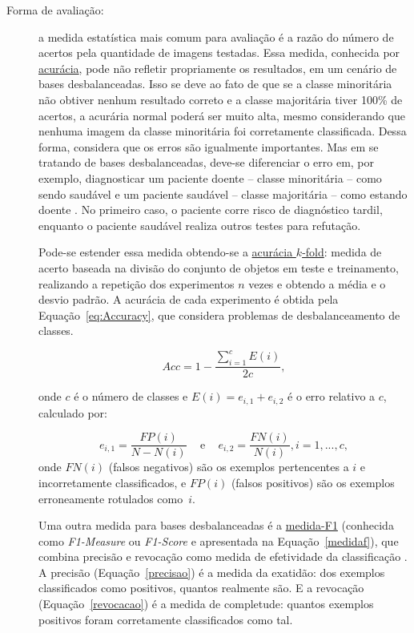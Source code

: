 \begin{description}
\item[Forma de avaliação:] a medida estatística mais comum para avaliação é a razão do número de acertos pela quantidade de imagens testadas. Essa medida, conhecida por \underline{acurácia}, pode não refletir propriamente os resultados, em um cenário de bases desbalanceadas. Isso se deve ao fato de que se a classe minoritária não obtiver nenhum resultado correto e a classe majoritária tiver 100\% de acertos, a acurária normal poderá ser muito alta, mesmo considerando que nenhuma imagem da classe minoritária foi corretamente classificada. Dessa forma, considera que os erros são igualmente importantes. Mas em se tratando de bases desbalanceadas, deve-se diferenciar o erro em, por exemplo, diagnosticar um paciente doente -- classe minoritária -- como sendo saudável e um paciente saudável -- classe majoritária -- como estando doente \cite{Batista2004}. No primeiro caso, o paciente corre risco de diagnóstico tardil, enquanto o paciente saudável realiza outros testes para refutação.

Pode-se estender essa medida obtendo-se a \underline{acurácia $k$-fold}: medida de acerto baseada na divisão do conjunto de objetos em teste e treinamento, realizando a repetição dos experimentos $n$ vezes e obtendo a média e o desvio padrão. A acurácia de cada experimento é obtida pela Equação~\ref{eq:Accuracy}, que considera problemas de desbalanceamento de classes.

    \begin{equation}
      Acc = 1 - \frac{\sum_{i=1}^{c} E(i)}{2c},
    \label{eq:Accuracy}
    \end{equation}

    \noindent onde $c$ é o número de classes e $E(i) = e_{i,1} + e_{i,2}$ é o erro relativo a $c$, calculado por:

    \begin{equation*}
      e_{i,1} = \frac{FP(i)}{N-N(i)} \,\,\,\,\, \text{ e } \,\,\,\,\, e_{i,2} = \frac{FN(i)}{N(i)}, i=1,...,c,
    \label{eq:Errors}
    \end{equation*}
   \noindent onde $FN(i)$ (falsos negativos) são os exemplos pertencentes a $i$ e incorretamente classificados, e $FP(i)$ (falsos positivos) são os exemplos erroneamente rotulados como~$i$.


Uma outra medida para bases desbalanceadas é a \underline{medida-F1} (conhecida como \textit{F1-Measure} ou \textit{F1-Score} e apresentada na Equação~\eqref{medidaf}), que combina precisão e revocação como medida de efetividade da classificação \cite{Garcia2009}. 
A precisão (Equação~\ref{precisao}) é a medida da exatidão: dos exemplos classificados como positivos, quantos realmente são. E a revocação (Equação~\ref{revocacao}) é a medida de completude: quantos exemplos positivos foram corretamente classificados como tal. 


\end{description}
